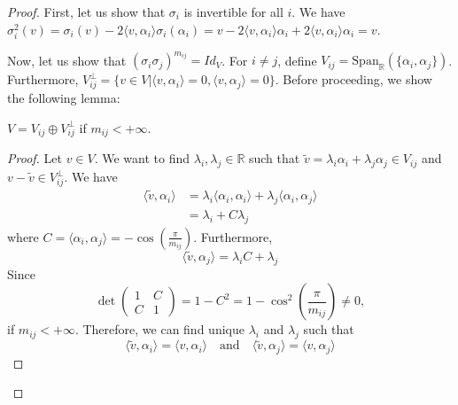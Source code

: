 \begin{proof}
First, let us show that $\sigma_i$ is invertible for all $i$. We have $\sigma^2_i (v) = \sigma_i (v) - 2 \langle v, \alpha_i \rangle \sigma_i (\alpha_i) = v - 2  \langle v, \alpha_i \rangle \alpha_i + 2  \langle v, \alpha_i \rangle \alpha_i = v$.

Now, let us show that $(\sigma_i \sigma_j)^{m_{ij}} = Id_V$. For $i\neq j$, define $V_{ij} = \text{Span}_\mathbb{R} ( \{ \alpha_i , \alpha_j \} )$. Furthermore, $V_{ij}^\perp = \{ v\in V | \langle v, \alpha_i \rangle = 0, \langle v, \alpha_j \rangle = 0 \}$. Before proceeding, we show the following lemma:

\begin{lemma}
$V = V_{ij} \oplus V_{ij}^\perp$ if $m_{ij} < + \infty$.
\end{lemma}

\begin{proof}
Let $v \in V$. We want to find $\lambda_i, \lambda_j \in \mathbb{R}$ such that $\tilde{v} = \lambda_i \alpha_i + \lambda_j \alpha_j \in V_{ij}$ and $v - \tilde{v} \in V_{ij}^\perp$. We have
\begin{equation}
\begin{split}
\langle \tilde{v}, \alpha_i \rangle &= \lambda_i \langle \alpha_i , \alpha_i \rangle + \lambda_j \langle \alpha_i, \alpha_j \rangle \\
&= \lambda_i + C \lambda_j
\end{split}
\end{equation} where $C = \langle \alpha_i, \alpha_j \rangle = - \cos \left( \frac{\pi}{m_{ij}} \right)$. Furthermore,
\begin{equation}
\langle \tilde{v}, \alpha_j \rangle = \lambda_i C + \lambda_j
\end{equation} Since
\begin{equation}
\det \begin{pmatrix}
1 & C \\
C & 1
\end{pmatrix} = 1 - C^2 = 1 - \cos^2 \left( \frac{\pi}{m_{ij}} \right) \neq 0,
\end{equation} if $m_{ij} < + \infty$. Therefore, we can find unique $\lambda_i$ and $\lambda_j$ such that
\begin{equation}
\langle \tilde{v} , \alpha_i \rangle = \langle v, \alpha_i \rangle \quad \text{and} \quad \langle \tilde{v} , \alpha_j \rangle = \langle v, \alpha_j \rangle
\end{equation}
\end{proof}


\end{proof}
